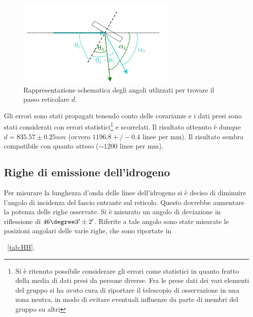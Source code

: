 \documentclass[a4paper,10pt]{article}
\begin{document}
{{{{{{\begin{figure}[H]
	\centering
	\includegraphics[width=0.7\textwidth]{../grafici/Angoli.png}
	\caption{Rappresentazione schematica degli angoli utlizzati per trovare il passo reticolare $d$.}
	\label{fig:angoli}
\end{figure}

Gli errori sono stati propagati tenendo conto delle covarianze e i dati presi sono stati considerati con errori statistici\footnote{Si è ritenuto possibile considerare gli errori come statistici in quanto frutto della media di dati presi da persone diverse. Fra le prese dati dei vari elementi del gruppo si ha avuto cura di riportare il telescopio di osservazione in una zona neutra, in modo di evitare eventuali influenze da parte di membri del gruppo su altri} e scorrelati. 
Il risultato ottenuto è dunque $d=835.57 \pm 0.25 nm$ (ovvero $1196.8+/-0.4$ linee per mm). Il risultato sembra compatibile con quanto atteso ($\sim 1200$ linee per mm).

\subsection{Righe di emissione dell'idrogeno}

Per misurare la lunghezza d'onda delle linee dell'idrogeno si è deciso di diminuire l'angolo di incidenza del fascio entrante sul reticolo. Questo
dovrebbe aumentare la potenza delle righe osservate. Si è misurato un angolo di deviazione in riflessione di $46\degree 3' \pm 2'$. Riferite a tale angolo sono state misurate le posizioni angolari delle varie righe, che sono riportate in \tablename{~\ref{tab:HH}.

}}}}}}}
\end{document}
